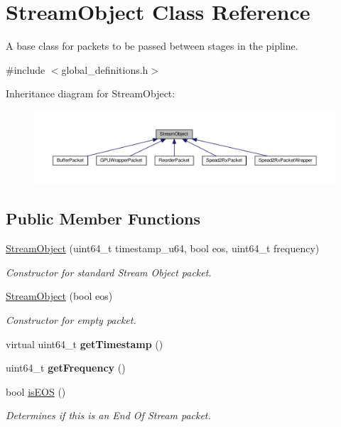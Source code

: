 \hypertarget{class_stream_object}{}\section{Stream\+Object Class Reference}
\label{class_stream_object}


A base class for packets to be passed between stages in the pipline.  




{\ttfamily \#include $<$global\+\_\+definitions.\+h$>$}



Inheritance diagram for Stream\+Object\+:\nopagebreak
\begin{figure}[H]
\begin{center}
\leavevmode
\includegraphics[width=350pt]{class_stream_object__inherit__graph}
\end{center}
\end{figure}
\subsection*{Public Member Functions}
\begin{DoxyCompactItemize}
\item 
\hyperlink{class_stream_object_a8f521852410be1709202cd1a70e8dd0a}{Stream\+Object} (uint64\+\_\+t timestamp\+\_\+u64, bool eos, uint64\+\_\+t frequency)
\begin{DoxyCompactList}\small\item\em Constructor for standard Stream Object packet. \end{DoxyCompactList}\item 
\hyperlink{class_stream_object_ac46c4aa9a3af957ba6bd4c2176dc6bd7}{Stream\+Object} (bool eos)
\begin{DoxyCompactList}\small\item\em Constructor for empty packet. \end{DoxyCompactList}\item 
virtual uint64\+\_\+t {\bfseries get\+Timestamp} ()\hypertarget{class_stream_object_a83f26b0514896d1d6cad3cf6930d94a0}{}\label{class_stream_object_a83f26b0514896d1d6cad3cf6930d94a0}

\item 
uint64\+\_\+t {\bfseries get\+Frequency} ()\hypertarget{class_stream_object_a60e40bf18263e9829c55444990ab890d}{}\label{class_stream_object_a60e40bf18263e9829c55444990ab890d}

\item 
bool \hyperlink{class_stream_object_ab4d09a5878fd7c9ffc808887316159d0}{is\+E\+OS} ()
\begin{DoxyCompactList}\small\item\em Determines if this is an End Of Stream packet. \end{DoxyCompactList}\end{DoxyCompactItemize}
